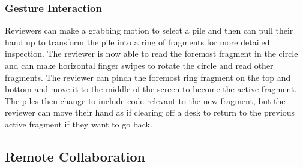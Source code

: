 \documentclass[conference]{IEEEtran}
\begin{document}

\subsubsection{Gesture Interaction}

Reviewers can make a grabbing motion to select a pile and then can pull their hand up to transform the pile into a ring of fragments for more detailed inspection.
The reviewer is now able to read the foremost fragment in the circle and can make horizontal finger swipes to rotate the circle and read other fragments. 
The reviewer can pinch the foremost ring fragment on the top and bottom and move it to the middle of the screen to become the active fragment.
The piles then change to include code relevant to the new fragment, but the reviewer can move their hand as if clearing off a desk to return to the previous active fragment if they want to go back.




\subsection{Remote Collaboration}
\end{document}

